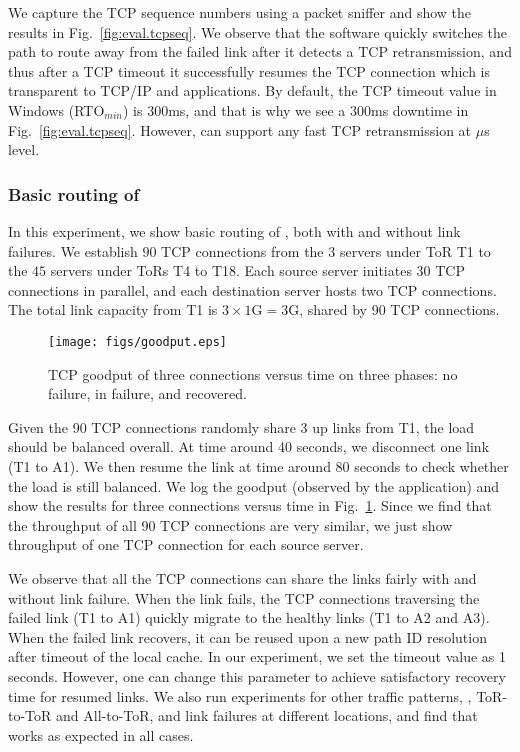 We capture the TCP sequence numbers using a packet sniffer and show the results in Fig.~\ref{fig:eval.tcpseq}. We observe that the \sys software quickly switches the path to route away from the failed link after it detects a TCP retransmission, and thus after a TCP timeout it successfully resumes the TCP connection which is transparent to TCP/IP and applications. By default, the TCP timeout value in Windows (RTO$_{min}$) is 300ms, and that is why we see a 300ms downtime in Fig.~\ref{fig:eval.tcpseq}. However, \sys can support any fast TCP retransmission at $\mu$s level.

\subsubsection{Basic routing of \sys}\label{subs.impl.load}
In this experiment, we show basic routing of \sys, both with and without link failures. We establish $90$ TCP connections from the $3$ servers under ToR T1 to the $45$ servers under ToRs T4 to T18. Each source server initiates 30 TCP connections in parallel, and each destination server hosts two TCP connections. The total link capacity from T1 is $3 \times 1$G$=3$G, shared by 90 TCP connections.

\begin{figure}[t]
\centering
\texttt{[image: figs/goodput.eps]}
\caption{TCP goodput of three connections versus time on three phases: no failure, in failure, and recovered.}\label{fig:eval.tcpvstime}
\end{figure}

Given the 90 TCP connections randomly share 3 up links from T1, the load should be balanced overall. At time around 40 seconds, we disconnect one link (T1 to A1). We then resume the link at time around 80 seconds to check whether the load is still balanced. We log the goodput (observed by the application) and show the results for three connections versus time in Fig.~\ref{fig:eval.tcpvstime}. Since we find that the throughput of all 90 TCP connections are very similar, we just show throughput of one TCP connection for each source server.

We observe that all the TCP connections can share the links fairly with and without link failure. When the link fails, the TCP connections traversing the failed link (T1 to A1) quickly migrate to the healthy links (T1 to A2 and A3). When the failed link recovers, it can be reused upon a new path ID resolution after timeout of the local cache. In our experiment, we set the timeout value as 1 seconds. However, one can change this parameter to achieve satisfactory recovery time for resumed links. We also run experiments for other traffic patterns, \eg, ToR-to-ToR and All-to-ToR, and link failures at different locations, and find that \sys works as expected in all cases.

